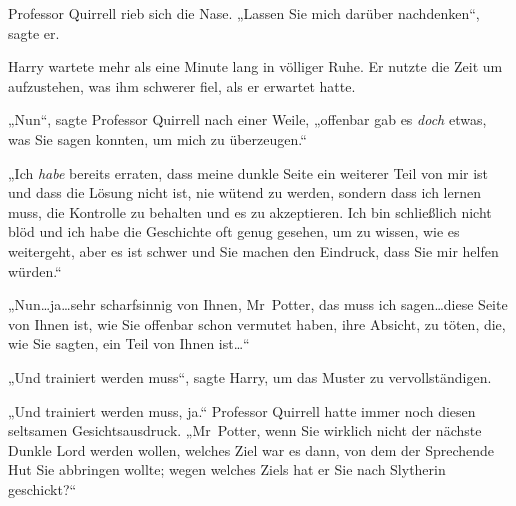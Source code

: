 Professor Quirrell rieb sich die Nase. „Lassen Sie mich darüber nachdenken“, sagte er.

Harry wartete mehr als eine Minute lang in völliger Ruhe. Er nutzte die Zeit um aufzustehen, was ihm schwerer fiel, als er erwartet hatte.

„Nun“, sagte Professor Quirrell nach einer Weile, „offenbar gab es \emph{doch} etwas, was Sie sagen konnten, um mich zu überzeugen.“

„Ich \emph{habe} bereits erraten, dass meine dunkle Seite ein weiterer Teil von mir ist und dass die Lösung nicht ist, nie wütend zu werden, sondern dass ich lernen muss, die Kontrolle zu behalten und es zu akzeptieren. Ich bin schließlich nicht blöd und ich habe die Geschichte oft genug gesehen, um zu wissen, wie es weitergeht, aber es ist schwer und Sie machen den Eindruck, dass Sie mir helfen würden.“

„Nun…ja…sehr scharfsinnig von Ihnen, Mr~Potter, das muss ich sagen…diese Seite von Ihnen ist, wie Sie offenbar schon vermutet haben, ihre Absicht, zu töten, die, wie Sie sagten, ein Teil von Ihnen ist…“

„Und trainiert werden muss“, sagte Harry, um das Muster zu vervollständigen.

„Und trainiert werden muss, ja.“ Professor Quirrell hatte immer noch diesen seltsamen Gesichtsausdruck. „Mr~Potter, wenn Sie wirklich nicht der nächste Dunkle Lord werden wollen, welches Ziel war es dann, von dem der Sprechende Hut Sie abbringen wollte; wegen welches Ziels hat er Sie nach Slytherin geschickt?“

